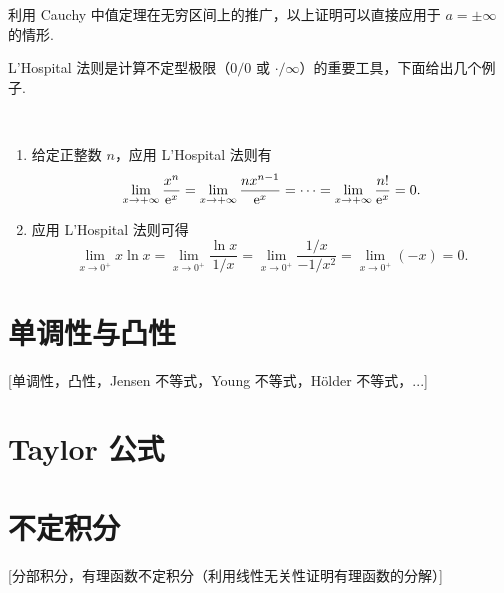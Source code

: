 \documentclass[../main.tex]{subfiles}
\begin{document}
\begin{remark}
    利用 Cauchy 中值定理在无穷区间上的推广，以上证明可以直接应用于 $a = \pm\infty$ 的情形. 
\end{remark}

L'Hospital 法则是计算不定型极限（$0 / 0$ 或 $\cdot / \infty$）的重要工具，下面给出几个例子. 

\begin{example}
    \ 
    \begin{enumerate}[label = (\alph*)]
        \item 给定正整数 $n$，应用 L'Hospital 法则有
        $$
        \lim_{x \to +\infty} \frac{x^n}{\mathrm{e}^x} = \lim_{x \to +\infty} \frac{n x^{n - 1}}{\mathrm{e}^x} = \cdots = \lim_{x \to +\infty} \frac{n!}{\mathrm{e}^x} = 0. 
        $$
        
        \item 应用 L'Hospital 法则可得
        $$
        \lim_{x \to 0^+} x \ln x = \lim_{x \to 0^+} \frac{\ln x}{1 / x} = \lim_{x \to 0^+} \frac{1 / x}{-1 / x^2} = \lim_{x \to 0^+} (-x) = 0. 
        $$
    \end{enumerate}
\end{example}

\section{单调性与凸性}

[单调性，凸性，Jensen 不等式，Young 不等式，H\"older 不等式，...]

\section{Taylor 公式}

\section{不定积分}

[分部积分，有理函数不定积分（利用线性无关性证明有理函数的分解）]
\end{document}
